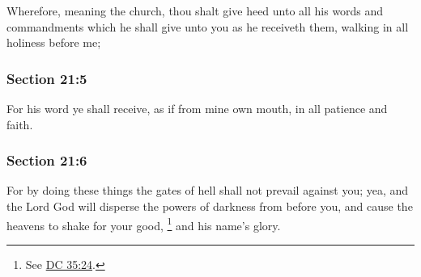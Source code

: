 		Wherefore, meaning the church, thou shalt give heed unto all his words and commandments which he shall give unto you as he receiveth them, walking in all holiness before me;


	\subsubsection{Section 21:5} %
		\label{DC21-5}

		For his word ye shall receive, as if from mine own mouth, in all patience and faith.


	\subsubsection{Section 21:6} %
		\label{DC21-6}

		For by doing these things the gates of hell shall not prevail against you; yea, and the Lord God will disperse the powers of darkness from before you, and cause the heavens to shake for your good,%
			\footnote{%
				See \hyperref[DC35-24]{DC 35:24}.
				}
		and his name's glory.


